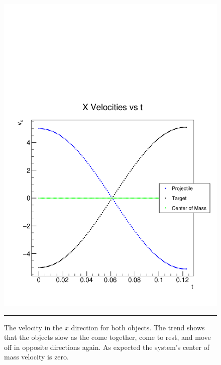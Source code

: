 \documentclass[aps,prl,floatfix,preprint,nofootinbib]{revtex4}
\begin{document}
\begin{figure}[h!]
  \includegraphics[width=.45\textwidth]{plots/out_c6/vx_vs_t.pdf}
                  {\par\nobreak\rule[9pt]{35em}{0.5pt}\vspace{-5mm}}
                  \caption{The velocity in the $x$ direction for both objects. The trend shows that the objects slow as the come together, come to rest, and move off in opposite directions again. As expected the system's center of mass velocity is zero.}
                  \label{fig:vx_c6}
\end{figure}
\end{document}
